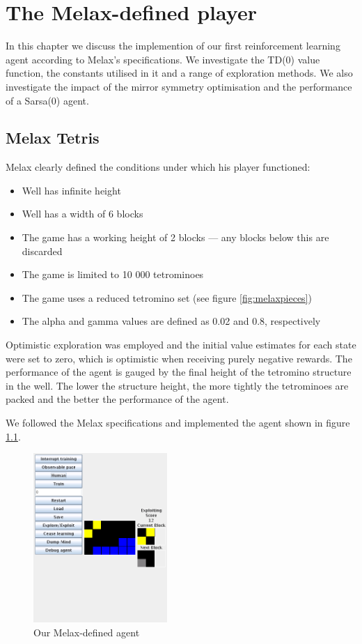 \documentclass{rucsthesis}
\begin{document}
\chapter{The Melax-defined player}

In this chapter we discuss the implemention of our first reinforcement learning agent according to Melax's specifications. We investigate the TD(0) value function, the constants utilised in it and a range of exploration methods. We also investigate the impact of the mirror symmetry optimisation and the performance of a Sarsa(0) agent.

\section{Melax Tetris \label{melaxchapt}}

Melax clearly defined the conditions under which his player functioned:

\begin{itemize}
\item{Well has infinite height}
\item{Well has a width of 6 blocks}
\item{The game has a working height of 2 blocks --- any blocks below this are discarded}
\item{The game is limited to 10 000 tetrominoes}
\item{The game uses a reduced tetromino set (see figure \ref{fig:melaxpieces})}
\item{The alpha and gamma values are defined as 0.02 and 0.8, respectively}
\end{itemize}

Optimistic exploration was employed and the initial value estimates for each state were set to zero, which is optimistic when receiving purely negative rewards. The performance of the agent is gauged by the final height of the tetromino structure in the well. The lower the structure height, the more tightly the tetrominoes are packed and the better the performance of the agent.

We followed the Melax specifications and implemented the agent shown in figure \ref{fig:mymelax}.

\begin{figure}[h]
\centering
\includegraphics[width=2in]{mymelax.png}
\caption{Our Melax-defined agent}
\label{fig:mymelax}
\end{figure}
\end{document}

